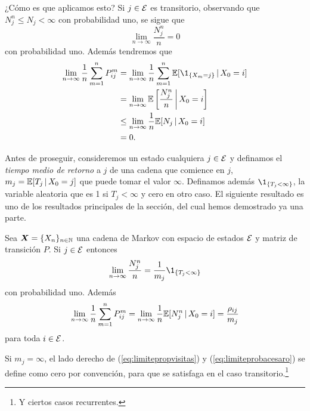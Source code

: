 ¿Cómo es que aplicamos esto?  Si $j \in \mathcal{E}$ es transitorio, observando que $N_j^n \leq N_j < \infty$ con probabilidad uno, se sigue que 
\[
    \lim_{n \to \infty} \frac {N_j^n} n = 0
\] 
con probabilidad uno. Además tendremos que 
\begin{align*}
    \lim_{n \to \infty} \frac 1 n \sum_{m = 1}^n P_{ij}^m & = \lim_{n \to \infty} \frac 1 n  \sum_{m = 1}^n \EE[\1_{\{X_m = j\}} \,\vert\, X_0 = i] \\
    & = \lim_{n \to \infty} \EE \left[ \frac {N_j^n} n \,\bigg\vert\, X_0 = i \right] \\
    & \leq \lim_{n \to \infty} \frac 1 n \EE[N_j \,\vert\, X_0 = i] \\
    & = 0.
\end{align*}

Antes de proseguir, consideremos un estado cualquiera $j \in \mathcal{E}$ y definamos el \emph{tiempo medio de retorno} a $j$ de una cadena que comience en $j$, $m_j = \mathbb{E}[T_j \,\vert\, X_0 = j]$ que puede tomar el valor $\infty$. Definamos además $\1_{\{T_j < \infty\}}$, la variable aleatoria que es 1 si $T_j < \infty$ y cero en otro caso. El siguiente resultado es uno de los resultados principales de la sección, del cual hemos demostrado ya una parte.

\begin{theorem} \label{teo:convergenciaprobacesaro}
    Sea $\bm X = \{X_n\}_{n \in \mathbb{N}}$ una cadena de Markov con espacio de estados $\mathcal{E}$ y matriz de transición $P$. Si $j \in \mathcal{E}$ entonces 
    \begin{equation}
        \lim_{n \to \infty} \frac {N_j^n} n = \frac 1 {m_j} \1_{\{T_j < \infty\}} \label{eq:limitepropvisitas}
    \end{equation}
    con probabilidad uno. Además
    \begin{equation}
        \lim_{n \to \infty} \frac 1 n \sum_{m = 1}^n P_{ij}^m = \lim_{n \to \infty} \frac 1 n \mathbb{E}[N_j^n \,\vert\, X_0 = i] = \frac {\rho_{ij}} {m_j} \label{eq:limiteprobacesaro}
    \end{equation}
    para toda $i \in \mathcal{E}$.
\end{theorem}

Si $m_j = \infty$, el lado derecho de (\ref{eq:limitepropvisitas}) y (\ref{eq:limiteprobacesaro}) se define como cero por convención, para que se satisfaga en el caso transitorio.\footnote{Y ciertos casos recurrentes.}

